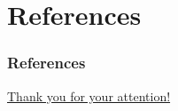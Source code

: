 \documentclass{beamer}
\begin{document}






\section*{References}

\begin{frame}[allowframebreaks]
\frametitle{References}
\vspace{-0.25cm}\printbibliography[heading = none]
\end{frame}


\begin{frame}
\centerline{\Huge\textcolor{structure}{\underline{Thank you for your attention!}}}
\end{frame}
\end{document}
